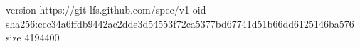 version https://git-lfs.github.com/spec/v1
oid sha256:ccc34a6ffdb9442ac2dde3d54553f72ca5377bd67741d51b66dd6125146ba576
size 4194400
